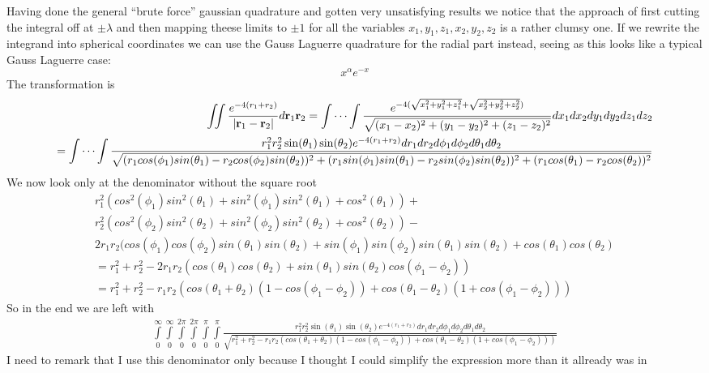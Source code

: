 \documentclass[a4paper,english, 10pt, twoside]{article}
\begin{document}
Having done the general ``brute force'' gaussian quadrature and gotten very unsatisfying results we notice that the approach of 
first cutting the integral off at $\pm \lambda$ and then mapping theese limits to $\pm 1$ for all the variables 
$x_1,y_1,z_1,x_2,y_2,z_2$ is a rather clumsy one. If we rewrite the integrand into spherical coordinates we can use the Gauss 
Laguerre quadrature for the radial part instead, seeing as this looks like a typical Gauss Laguerre case:
$$
x^{\alpha}e^{-x}
$$
The transformation is
\begin{align*}
\iint \frac{e^{-4(r_1+r_2)}}{\left|\mathbf{r}_1-\mathbf{r}_2\right|}d\mathbf{r}_1\mathbf{r}_2 = 
\idotsint \frac{e^{-4(\sqrt{x_1^2 + y_1^2 + z_1^2}+\sqrt{x_2^2 + y_2^2 + z_2^2})}}{\sqrt{(x_1-x_2)^2+(y_1-y_2)^2+(z_1-z_2)^2}}
dx_1dx_2dy_1dy_2dz_1dz_2\\
 = \idotsint\frac{r_1^2r_2^2\sin(\theta_1)\sin(\theta_2)e^{-4(r_1+r_2)}dr_1dr_2d\phi_1d\phi_2d\theta_1d\theta_2}
 {\sqrt{(r_1cos(\phi_1)sin(\theta_1)-r_2cos(\phi_2)sin(\theta_2))^2
 +(r_1sin(\phi_1)sin(\theta_1)-r_2sin(\phi_2)sin(\theta_2))^2+(r_1cos(\theta_1)-r_2cos(\theta_2))^2}}
\end{align*}
We now look only at the denominator without the square root
\begin{align*}
r_1^2(cos^2(\phi_1)sin^2(\theta_1)+sin^2(\phi_1)sin^2(\theta_1)+cos^2(\theta_1)) + \\
r_2^2(cos^2(\phi_2)sin^2(\theta_2)+sin^2(\phi_2)sin^2(\theta_2)+cos^2(\theta_2)) -\\
2r_1r_2(cos(\phi_1)cos(\phi_2)sin(\theta_1)sin(\theta_2) + sin(\phi_1)sin(\phi_2)sin(\theta_1)sin(\theta_2) + cos(\theta_1)cos(\theta_2)\\
= r_1^2 + r_2^2 -2r_1r_2(cos(\theta_1)cos(\theta_2)+sin(\theta_1)sin(\theta_2)cos(\phi_1 - \phi_2))\\
= r_1^2 + r_2^2 -r_1r_2(cos(\theta_1+\theta_2)(1-cos(\phi_1 - \phi_2))+cos(\theta_1-\theta_2)(1+cos(\phi_1 - \phi_2)))
\end{align*}
So in the end we are left with
\begin{align*}
\int\limits_0^{\infty}\int\limits_0^{\infty}\int\limits_0^{2\pi}\int\limits_0^{2\pi}\int\limits_0^{\pi}\int\limits_0^{\pi}
\frac{r_1^2r_2^2\sin(\theta_1)\sin(\theta_2)e^{-4(r_1+r_2)}dr_1dr_2d\phi_1d\phi_2d\theta_1d\theta_2}
{\sqrt{r_1^2 + r_2^2 -r_1r_2(cos(\theta_1+\theta_2)(1-cos(\phi_1 - \phi_2))+cos(\theta_1-\theta_2)(1+cos(\phi_1 - \phi_2)))}}
\end{align*}
I need to remark that I use this denominator only because I thought I could simplify the expression more than it allready was in 
\end{document}
